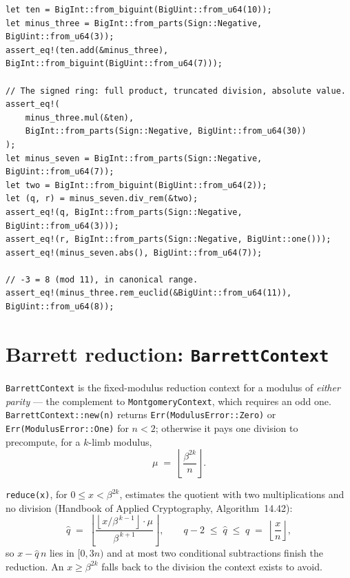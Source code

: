 \documentclass[11pt]{article}
\newcommand{\code}[1]{\texttt{#1}}
\begin{document}
\begin{lstlisting}
let ten = BigInt::from_biguint(BigUint::from_u64(10));
let minus_three = BigInt::from_parts(Sign::Negative, BigUint::from_u64(3));
assert_eq!(ten.add(&minus_three), BigInt::from_biguint(BigUint::from_u64(7)));

// The signed ring: full product, truncated division, absolute value.
assert_eq!(
    minus_three.mul(&ten),
    BigInt::from_parts(Sign::Negative, BigUint::from_u64(30))
);
let minus_seven = BigInt::from_parts(Sign::Negative, BigUint::from_u64(7));
let two = BigInt::from_biguint(BigUint::from_u64(2));
let (q, r) = minus_seven.div_rem(&two);
assert_eq!(q, BigInt::from_parts(Sign::Negative, BigUint::from_u64(3)));
assert_eq!(r, BigInt::from_parts(Sign::Negative, BigUint::one()));
assert_eq!(minus_seven.abs(), BigUint::from_u64(7));

// -3 = 8 (mod 11), in canonical range.
assert_eq!(minus_three.rem_euclid(&BigUint::from_u64(11)), BigUint::from_u64(8));
\end{lstlisting}
\section{Barrett reduction: \code{BarrettContext}}
\label{sec:barrett}

\code{BarrettContext} is the fixed-modulus reduction context for a modulus of
\emph{either parity} --- the complement to \code{MontgomeryContext}, which
requires an odd one. \code{BarrettContext::new(n)} returns
\code{Err(ModulusError::Zero)} or \code{Err(ModulusError::One)} for
$n < 2$; otherwise it pays one division to precompute, for a $k$-limb
modulus,
\begin{equation}
\mu \;=\; \left\lfloor \frac{\beta^{2k}}{n} \right\rfloor .
\end{equation}

\code{reduce(x)}, for $0 \le x < \beta^{2k}$, estimates the quotient with
two multiplications and no division (Handbook of Applied Cryptography,
Algorithm~14.42):
\begin{equation}
\hat q \;=\; \left\lfloor
\frac{\left\lfloor x / \beta^{\,k-1} \right\rfloor \cdot \mu}{\beta^{\,k+1}}
\right\rfloor,
\qquad
q - 2 \;\le\; \hat q \;\le\; q \;=\; \left\lfloor \frac{x}{n} \right\rfloor,
\end{equation}
so $x - \hat q\,n$ lies in $[0, 3n)$ and at most two conditional
subtractions finish the reduction. An $x \ge \beta^{2k}$ falls back to the
division the context exists to avoid.
\end{document}
